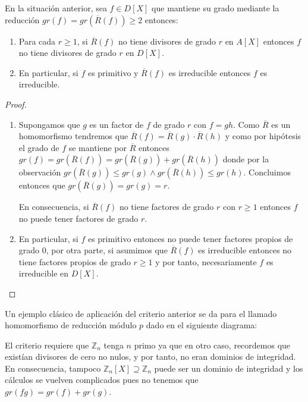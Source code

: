 \begin{theorem}
En la situación anterior, sea $f \in D[X]$ que mantiene su grado mediante la reducción $gr(f) = gr(\overline{R}(f)) \ge 2$ entonces:

\begin{enumerate}
\item Para cada $r \ge 1$, si $\overline{R}(f)$ no tiene divisores de grado $r$ en $A[X]$ entonces $f$ no tiene divisores de grado $r$ en $D[X]$.
\item En particular, si $f$ es primitivo y $\overline{R}(f)$ es irreducible entonces $f$ es irreducible. 
\end{enumerate}
\end{theorem}
\begin{proof}
\begin{enumerate}
\item Supongamos que $g$ es un factor de $f$ de grado $r$ con $f = gh$.  Como $\overline{R}$ es un homomorfismo tendremos que $\overline{R}(f) = \overline{R}(g) \cdot \overline{R}(h)$ y como por hipótesis el grado de $f$ se mantiene por $\overline{R}$ entonces $gr(f) = gr(\overline{R}(f)) = gr(\overline{R}(g)) + gr(\overline{R}(h))$ donde por la observación $gr(\overline{R}(g)) \le gr(g) \land gr(\overline{R}(h)) \le gr(h)$. Concluimos entonces que $gr(\overline{R}(g)) = gr(g) = r$. 

En consecuencia, si $\overline{R}(f)$ no tiene factores de grado $r$ con $r \ge 1$ entonces $f$ no puede tener factores de grado $r$.

\item En particular, si $f$ es primitivo entonces no puede tener factores propios de grado $0$, por otra parte, si asumimos que $\overline{R}(f)$ es irreducible entonces no tiene factores propios de grado $r \ge 1$ y por tanto, necesariamente $f$ es irreducible en $D[X]$. 
\end{enumerate}
\end{proof}

Un ejemplo clásico de aplicación del criterio anterior se da para el llamado homomorfismo de reducción módulo $p$ dado en el siguiente diagrama:


El criterio requiere que $\mathbb{Z}_n$ tenga $n$ primo ya que en otro caso, recordemos que existían divisores de cero no nulos, y por tanto, no eran dominios de integridad. En consecuencia, tampoco $\mathbb{Z}_n[X] \supseteq \mathbb{Z}_n$ puede ser un dominio de integridad y los cálculos se vuelven complicados pues no tenemos que $gr(fg) = gr(f)+gr(g)$. 


